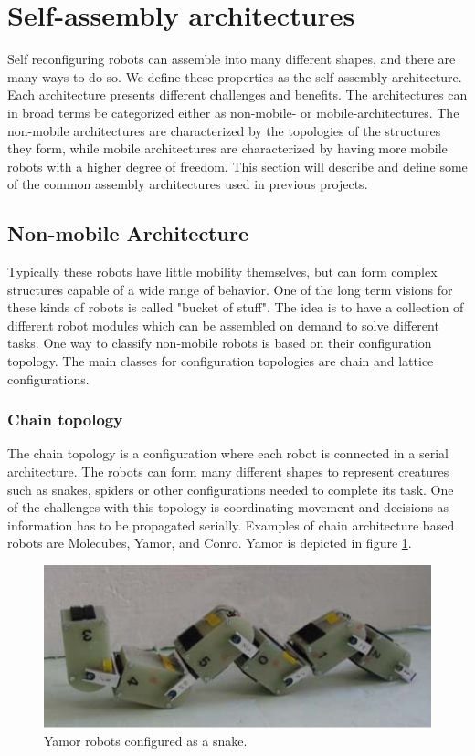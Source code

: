 \section{Self-assembly architectures}
\label{sec:sfArchitecture}
Self reconfiguring robots can assemble into many different shapes, and there are many ways to do so.
We define these properties as the self-assembly architecture.
Each architecture presents different challenges and benefits.
The architectures can in broad terms be categorized either as non-mobile- or mobile-architectures.
The non-mobile architectures are characterized by the topologies of the structures they form, while mobile architectures are characterized by having more mobile robots with a higher degree of freedom.
This section will describe and define some of the common assembly architectures used in previous projects.
\subsection{Non-mobile Architecture}
Typically these robots have little mobility themselves, but can form complex structures capable of a wide range of behavior.
One of the long term visions for these kinds of robots is called "bucket of stuff"\cite{yim_modular_2007}.
The idea is to have a collection of different robot modules which can be assembled on demand to solve different tasks.
One way to classify non-mobile robots is based on their configuration topology.
The main classes for configuration topologies are chain and lattice configurations.
\subsubsection{Chain topology}
The chain topology is a configuration where each robot is connected in a serial architecture.
The robots can form many different shapes to represent creatures such as snakes, spiders or other configurations needed to complete its task.
One of the challenges with this topology is coordinating movement and decisions as information has to be propagated serially.
Examples of chain architecture based robots are Molecubes\cite{zykov_molecubes:_2007}, Yamor\cite{mockel_yamor_2006}, and Conro\cite{castano_conro:_2000}.
Yamor is depicted in figure \ref{fig:yamor}.
\begin{figure}[H]	
	\centering
	\includegraphics[scale=0.5]{chapters/res/Yamor.PNG}
	\caption{Yamor robots configured as a snake\cite{mockel_yamor_2006}.}
	\label{fig:yamor}
\end{figure}

